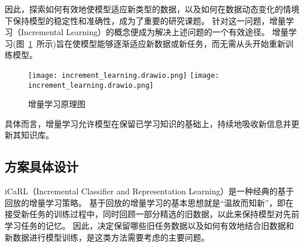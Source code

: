 因此，探索如何有效地使模型适应新类型的数据，以及如何在数据动态变化的情境下保持模型的稳定性和准确性，成为了重要的研究课题。
针对这一问题，增量学习（Incremental Learning）的概念便成为解决上述问题的一个有效途径。
增量学习(图~\ref{fig:incremental_learning}~所示)旨在使模型能够逐渐适应新数据或新任务，而无需从头开始重新训练模型。
\begin{figure}[htbp]
	\centering
	\texttt{[image: increment\_learning.drawio.png]}
	\texttt{[image: increment\_learning.drawio.png]}
	\caption{增量学习原理图}
	\label{fig:incremental_learning}
\end{figure}
具体而言，增量学习允许模型在保留已学习知识的基础上，持续地吸收新信息并更新其知识库。

\subsection{方案具体设计}
iCaRL（Incremental Classifier and Representation Learning）\cite{rebuffi2017icarl}是一种经典的基于回放的增量学习策略。
基于回放的增量学习的基本思想就是“温故而知新”，即在接受新任务的训练过程中，同时回顾一部分精选的旧数据，以此来保持模型对先前学习任务的记忆。
因此，决定保留哪些旧任务数据以及如何有效地结合旧数据和新数据进行模型训练，是这类方法需要考虑的主要问题。\par

